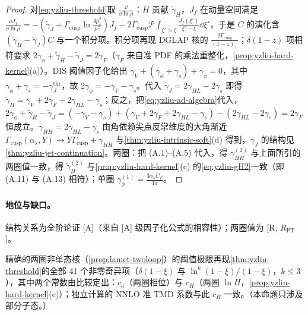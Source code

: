 \begin{proof}
对\cref{eq:yzliu-threshold}取 $\frac{\dd}{\dd\ln\mu}$：$H$ 贡献 $\tilde\gamma_H$，$J_f$ 在动量空间满足 $\frac{\dd J_f}{\dd\ln\mu}=-(\tilde\gamma_J+\Gamma_{\mathrm{cusp}}\ln\frac{4p_z^2}{\mu^2})J_f-2\Gamma_{\mathrm{cusp}}\mathcal P\!\int_{\xi'>\xi}\frac{J_f(\xi')}{\xi'-\xi}\dd\xi'$，于是 $C$ 的演化含 $(\tilde\gamma_H-\tilde\gamma_J)C$ 与一个积分项\cite[附录~A]{Ji:2023pba}。积分项再现 DGLAP 核的 $\frac{2\Gamma_{\mathrm{cusp}}}{(1-z)_+}$；$\delta(1-z)$ 项相符要求 $2\gamma_\phi+\tilde\gamma_H-\tilde\gamma_J=2\gamma_F$（$\gamma_F$ 来自准 PDF 的乘法重整化，\cref{prop:yzliu-hard-kernel}(a)）。DIS 阈值因子化给出 $\gamma_V+(\gamma_\phi+\gamma_s)+\gamma_\phi=0$，其中 $\gamma_\phi+\gamma_s=-\gamma^{\mathrm{thr}}_J$，故 $2\gamma_\phi=-\gamma_V-\gamma_s$。代入 $\tilde\gamma_J=2\gamma_{HL}-2\gamma_s$ 即得 $\tilde\gamma_H=\gamma_V+2\gamma_F+2\gamma_{HL}-\gamma_s$；反之，把\cref{eq:yzliu-ad-algebra}代入，$2\gamma_\phi+\tilde\gamma_H-\tilde\gamma_J=(-\gamma_V-\gamma_s)+(\gamma_V+2\gamma_F+2\gamma_{HL}-\gamma_s)-(2\gamma_{HL}-2\gamma_s)=2\gamma_F$ 恒成立。$\gamma_{HH}=2\gamma_{HL}-\gamma_s$ 由角依赖尖点反常维度的大角渐近 $\Gamma_{\mathrm{cusp}}(\alpha_s,Y)\to Y\Gamma_{\mathrm{cusp}}+\gamma_{HH}$ 与\cref{thm:yzliu-intrinsic-soft}(d) 得到，$\tilde\gamma_J$ 的结构见\cref{thm:yzliu-jet-continuation}。两圈：把 (A.1)--(A.5) 代入，得 $\gamma^{(2)}_{HH}$ 与上面所引的两圈值一致，得 $\tilde\gamma^{(2)}_H$ 与\cref{prop:yzliu-hard-kernel}(c) 的\cref{eq:yzliu-gH2}一致（即 (A.11) 与 (A.13) 相符）；单圈 $\gamma^{(1)}_\phi=\frac{3\alpha_sC_F}{4\pi}$。
\end{proof}

\paragraph{地位与缺口。}结构关系为全阶论证 [A]（来自 [A] 级因子化公式的相容性）；两圈值为 [R, $R_{\mathrm{PT}}$]。

\begin{proposition}\label{prop:yzliu-threshold-nnlo}
精确的两圈非单态核\cite{Li:2020xml,Chen:2020ody}（\cref{prop:lamet-twoloop}）的阈值极限再现\cref{thm:yzliu-threshold}的全部 41 个非零奇异项（$\delta(1-\xi)$ 与 $\ln^k(1-\xi)/(1-\xi)$，$k\le3$），其中两个常数由比较定出：$c_a$（两圈相位）与 $c_H$（两圈 $\ln H$，\cref{prop:yzliu-hard-kernel}(c)）；独立计算的 NNLO 准 TMD 系数\cite{delRio:2023pse}与此 $c_H$ 一致。（本命题只涉及部分子态。）
\end{proposition}

